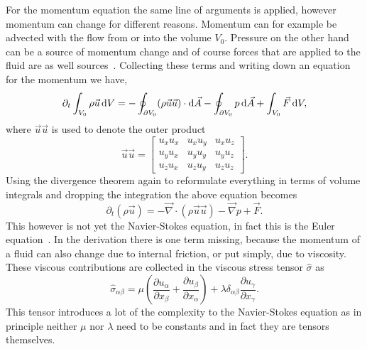 For the momentum equation the same line of arguments is applied, however momentum can change for different reasons.
Momentum can for example be advected with the flow from or into the volume $V_0$.
Pressure on the other hand can be a source of momentum change and of course forces that are applied to the fluid are as well sources~\cite{krugerLatticeBoltzmannMethod2017}.
Collecting these terms and writing down an equation for the momentum we have,
\begin{equation}\label{eq:navier_stokes_1}
    \partial_t \int_{V_0}\rho\vec{u}\mathop{}\!\mathrm{d} V = -\oint_{\partial V_0}(\rho\vec{u}\vec{u})\cdot\mathop{}\!\mathrm{d}\vec{A} - \oint_{\partial V_0} p\mathop{}\!\mathrm{d}\vec{A} + \int_{V_0} \vec{F}\mathop{}\!\mathrm{d} V, 
\end{equation}
where $\vec{u}\vec{u}$ is used to denote the outer product
\begin{equation}
    \vec{u}\vec{u} = \begin{bmatrix}
    u_x u_x & u_x u_y & u_x u_z \\
    u_y u_x & u_y u_y & u_y u_z \\
    u_z u_x & u_z u_y & u_z u_z
    \end{bmatrix} .
\end{equation}
Using the divergence theorem again to reformulate everything in terms of volume integrals and dropping the integration the above equation becomes
\begin{equation}\label{eq:navier_stokes_2}
    \partial_t(\rho\vec{u}) = -\vec{\nabla}\cdot(\rho\vec{u}\vec{u}) - \vec{\nabla} p + \vec{F}.
\end{equation}
This however is not yet the Navier-Stokes equation, in fact this is the Euler equation~\cite{batchelorIntroductionFluidDynamics1967}.
In the derivation there is one term missing, because the momentum of a fluid can also change due to internal friction, or put simply, due to viscosity.
These viscous contributions are collected in the viscous stress tensor $\hat{\sigma}$ as
\begin{equation}\label{eq:stress_tens}
    \hat{\sigma}_{\alpha\beta} = \mu\left(\frac{\partial u_{\alpha}}{\partial x_{\beta}} + \frac{\partial u_{\beta}}{\partial x_{\alpha}}\right) + \lambda\delta_{\alpha\beta}\frac{\partial u_{\gamma}}{\partial x_{\gamma}}.
\end{equation}
This tensor introduces a lot of the complexity to the Navier-Stokes equation as in principle neither $\mu$ nor $\lambda$ need to be constants and in fact they are tensors themselves.

